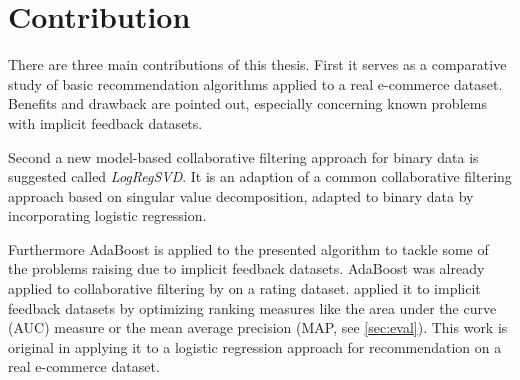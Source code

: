 \documentclass[10pt]{reportMaster}
\begin{document}
\section{Contribution}
There are three main contributions of this thesis.
First it serves as a comparative study of basic recommendation algorithms applied to a real e-commerce dataset.
Benefits and drawback are pointed out, especially concerning known problems with implicit feedback datasets.

Second a new model-based collaborative filtering approach for binary data is suggested called \textit{LogRegSVD}.
It is an adaption of a common collaborative filtering approach based on singular value decomposition, adapted to binary data by incorporating logistic regression.

Furthermore AdaBoost is applied to the presented algorithm to tackle some of the problems raising due to implicit feedback datasets.
AdaBoost was already applied to collaborative filtering by \cite{boostingCFRatings} on a rating dataset.
\cite{boostingAUC} applied it to implicit feedback datasets by optimizing ranking measures like the area under the curve (AUC) measure or the mean average precision (MAP, see \ref{sec:eval}).
This work is original in applying it to a logistic regression approach for recommendation on a real e-commerce dataset.
\end{document}
